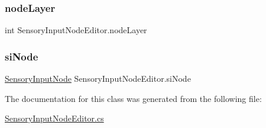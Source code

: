\subsubsection{\texorpdfstring{node\+Layer}{nodeLayer}}
{\footnotesize\ttfamily int Sensory\+Input\+Node\+Editor.\+node\+Layer}

\mbox{\label{class_sensory_input_node_editor_a276780a449128bccbae7730ef816f6db}} 
\subsubsection{\texorpdfstring{si\+Node}{siNode}}
{\footnotesize\ttfamily \mbox{\hyperlink{class_sensory_input_node}{Sensory\+Input\+Node}} Sensory\+Input\+Node\+Editor.\+si\+Node}



The documentation for this class was generated from the following file\+:\begin{DoxyCompactItemize}
\item 
\mbox{\hyperlink{_sensory_input_node_editor_8cs}{Sensory\+Input\+Node\+Editor.\+cs}}\end{DoxyCompactItemize}
